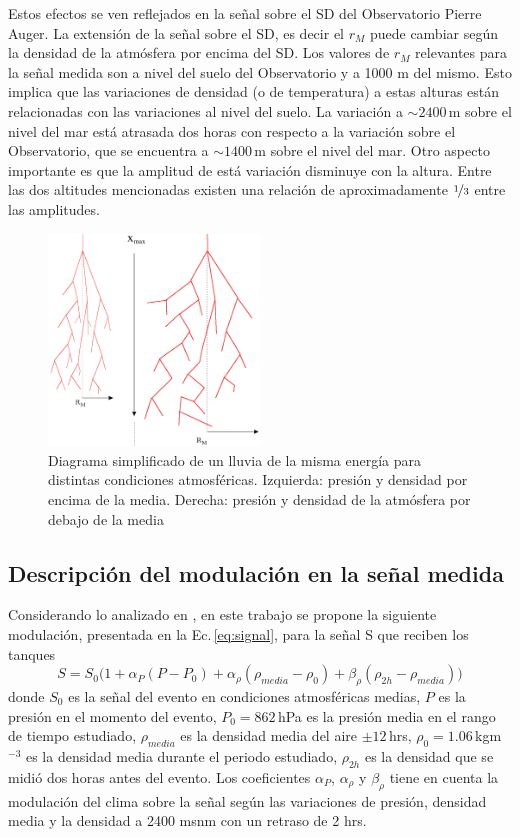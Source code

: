 Estos efectos se ven reflejados en la señal sobre el SD del Observatorio Pierre Auger. La extensión de la señal sobre el SD, es decir el $r_M$ puede cambiar según la densidad de la atmósfera por encima del SD. Los valores de $r_M$ relevantes para la señal medida son a nivel del suelo del Observatorio y a 1000 m del mismo. Esto implica que las variaciones de densidad (o de temperatura) a estas alturas están relacionadas con las variaciones al nivel del suelo. La variación a $\sim2400\,$m sobre el nivel del mar está atrasada dos horas con respecto a la variación sobre el Observatorio, que se encuentra a $\sim1400\,$m sobre el nivel del mar. Otro aspecto importante es que la amplitud de está variación disminuye con la altura. Entre las dos altitudes mencionadas existen una relación de aproximadamente $\nicefrac{1}{3}$ entre las amplitudes. 


\begin{figure}[H]
	\centering
	\includegraphics[width=0.5\textwidth]{eas.png}
	\caption{Diagrama simplificado de un lluvia de la misma energía para distintas condiciones atmosféricas. Izquierda: presión y  densidad  por encima de la media. Derecha: presión y densidad de la atmósfera por debajo de la media}
	\label{fig:eas}
\end{figure}

\subsection{Descripción del modulación en la señal medida}

Considerando lo analizado en \cite{aab2017impact} \cite{collaboration2009atmospheric}, en este trabajo se propone la siguiente modulación, presentada en la Ec.\,\ref{eq:signal}, para la señal S que reciben los tanques 
\begin{equation}
	S=S_0\big(1+\alpha_P(P-P_0) +\alpha_{\rho}(\rho_{media}-\rho_0) + \beta_{\rho}(\rho_{2h}-\rho_{media})\big)
	\label{eq:signal}
\end{equation}
donde $S_0$ es la señal  del evento en condiciones atmosféricas medias, $P$ es la presión en el momento del evento, $P_0=862\,$hPa es la presión media en el rango de tiempo estudiado, $\rho_{media}$ es la densidad  media del aire $\pm 12\,$hrs,     $\rho_0=1.06\,$kgm$^{-3}$ es la densidad media durante el periodo estudiado, $\rho_{2h}$ es la densidad que se midió dos horas antes del evento. Los coeficientes $\alpha_P$, $\alpha_\rho$ y $\beta_\rho$ tiene en cuenta la modulación del clima sobre la señal según las variaciones de presión,  densidad media y la densidad a 2400 msnm con un retraso de 2 hrs.  

